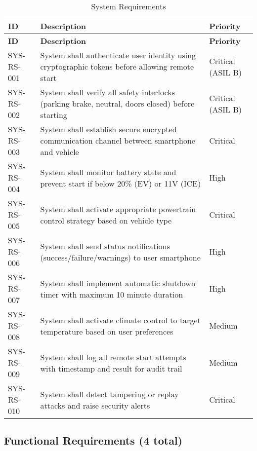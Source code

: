 \documentclass[11pt,a4paper]{article}
\begin{document}
\begin{longtable}{|p{2.5cm}|p{10cm}|p{2cm}|}
\caption{System Requirements}\label{tab:system_req}\\
\hline
\textbf{ID} & \textbf{Description} & \textbf{Priority} \\
\hline
\endfirsthead
\hline
\textbf{ID} & \textbf{Description} & \textbf{Priority} \\
\hline
\endhead
\hline
\endfoot

SYS-RS-001 & System shall authenticate user identity using cryptographic tokens before allowing remote start & Critical (ASIL B) \\
\hline
SYS-RS-002 & System shall verify all safety interlocks (parking brake, neutral, doors closed) before starting & Critical (ASIL B) \\
\hline
SYS-RS-003 & System shall establish secure encrypted communication channel between smartphone and vehicle & Critical \\
\hline
SYS-RS-004 & System shall monitor battery state and prevent start if below 20\% (EV) or 11V (ICE) & High \\
\hline
SYS-RS-005 & System shall activate appropriate powertrain control strategy based on vehicle type & Critical \\
\hline
SYS-RS-006 & System shall send status notifications (success/failure/warnings) to user smartphone & High \\
\hline
SYS-RS-007 & System shall implement automatic shutdown timer with maximum 10 minute duration & High \\
\hline
SYS-RS-008 & System shall activate climate control to target temperature based on user preferences & Medium \\
\hline
SYS-RS-009 & System shall log all remote start attempts with timestamp and result for audit trail & Medium \\
\hline
SYS-RS-010 & System shall detect tampering or replay attacks and raise security alerts & Critical \\
\hline
\end{longtable}

\subsection{Functional Requirements (4 total)}
\end{document}
